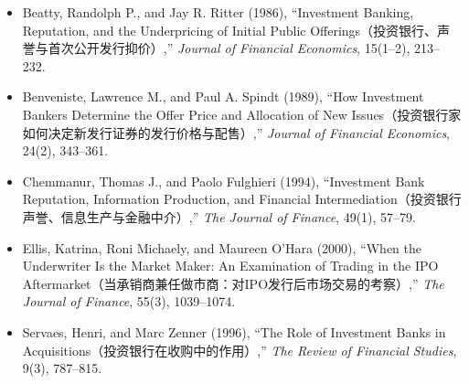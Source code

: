 \begin{itemize}

\item Beatty, Randolph P., and Jay R. Ritter (1986),
``Investment Banking, Reputation, and the Underpricing of Initial Public Offerings（投资银行、声誉与首次公开发行抑价）,''
\emph{Journal of Financial Economics}, 15(1--2), 213--232.

\item Benveniste, Lawrence M., and Paul A. Spindt (1989),
``How Investment Bankers Determine the Offer Price and Allocation of New Issues（投资银行家如何决定新发行证券的发行价格与配售）,''
\emph{Journal of Financial Economics}, 24(2), 343--361.

\item Chemmanur, Thomas J., and Paolo Fulghieri (1994),
``Investment Bank Reputation, Information Production, and Financial Intermediation（投资银行声誉、信息生产与金融中介）,''
\emph{The Journal of Finance}, 49(1), 57--79.

\item Ellis, Katrina, Roni Michaely, and Maureen O'Hara (2000),
``When the Underwriter Is the Market Maker: An Examination of Trading in the IPO Aftermarket（当承销商兼任做市商：对IPO发行后市场交易的考察）,''
\emph{The Journal of Finance}, 55(3), 1039--1074.

\item Servaes, Henri, and Marc Zenner (1996),
``The Role of Investment Banks in Acquisitions（投资银行在收购中的作用）,''
\emph{The Review of Financial Studies}, 9(3), 787--815.

\end{itemize}

